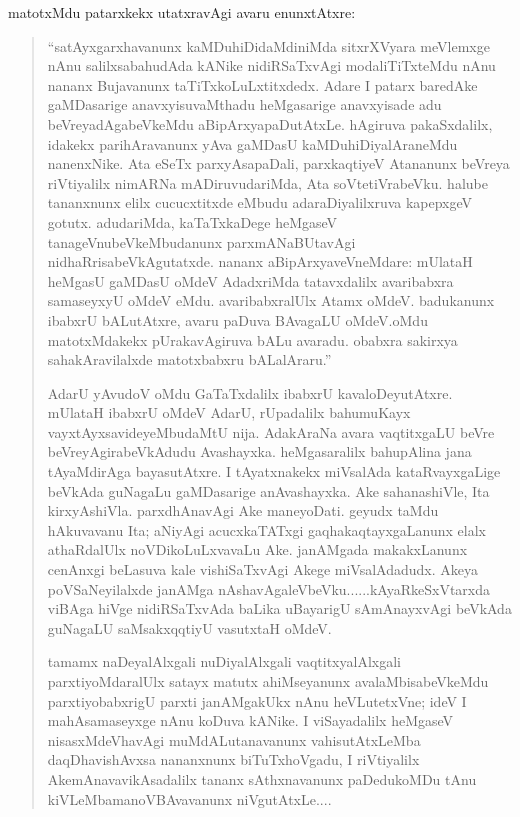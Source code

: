 matotxMdu patarxkekx utatxravAgi avaru enunxtAtxre:
\begin{quote}
``satAyxgarxhavanunx kaMDuhiDidaMdiniMda sitxrXVyara meVlemxge nAnu salilxsa\-bahudAda kANike nidiRSaTxvAgi modaliTiTxteMdu nAnu nananx Buja\-vanunx taTiTxkoLuLxtitxdedx. Adare I patarx baredAke gaMDasarige anavxyisuvaMthadu heMgasarige anavxyisade adu beVreyadAgabeVkeMdu aBipArxyapaDu\-tAtxLe. hAgiruva pakaSxdalilx, idakekx parihAravanunx yAva gaMDasU kaMDu\-hiDiyalAraneMdu nanenxNike. Ata eSeTx parxyAsapaDali, parxkaqtiyeV Ata\-nanunx beVreya riVtiyalilx nimARNa mADiruvudariMda, Ata soVte\-tiVrabeVku. halube tananxnunx elilx cucucxtitxde eMbudu adaraDiyalilxruva kapepxgeV gotutx. adudariMda, kaTaTxkaDege heMgaseV tanageVnubeVkeMbu\-danunx parxmANaBUtavAgi nidhaRrisabeVkAgutatxde. nananx aBipArxya\-veV\-neMdare: mUlataH heMgasU gaMDasU oMdeV AdadxriMda tatavxdalilx ava\-ribabxra samaseyxyU oMdeV eMdu. avaribabxralUlx Atamx oMdeV. badu\-kanunx ibabxrU bALutAtxre, avaru paDuva BAvagaLU oMdeV.\break \hbox{oMdu} matotxM\-dakekx pUrakavAgiruva bALu avaradu. obabxra sakirxya sahakAra\-vilalxde matotxbabxru bALalAraru.''

AdarU yAvudoV oMdu GaTaTxdalilx ibabxrU kavaloDeyutAtxre. mUlataH ibabxrU oMdeV AdarU, rUpadalilx bahumuKayx vayxtAyxsa\-videyeMbudaMtU nija. AdakAraNa avara vaqtitxgaLU beVre beVre\break\-yAgirabeVkAdudu Avashayxka. heMgasaralilx bahupAlina jana tAyaMdi\-rAga bayasutAtxre. I tAyatxnakekx miVsalAda kataRvayxgaLige beVkAda guNagaLu gaMDasarige anAvashayxka. Ake sahanashiVle, Ita kirxyAshiVla. parxdhAnavAgi Ake maneyoDati. geyudx taMdu hAkuvavanu Ita; aNiyAgi acucxkaTATxgi gaqhakaqtayxgaLanunx elalx athaRdalUlx noVDikoLuLxvavaLu Ake. janAMgada makakxLanunx cenAnxgi beLasuva kale vishiSaTxvAgi Akege miVsalAdadudx. Akeya poVSaNeyilalxde janAMga nAshavAgaleVbeVku......kAyaRkeSxVtarxda viBAga hiVge nidiRSaTxvAda baLika uBayarigU sAmAnayxvAgi beVkAda guNagaLU saMsakxqqtiyU vasutxtaH oMdeV.

tamamx naDeyalAlxgali nuDiyalAlxgali vaqtitxyalAlxgali parxtiyoMda\-ralUlx satayx matutx ahiMseyanunx avalaMbisabeVkeMdu parxtiyobabxrigU parxti janAMgakUkx nAnu heVLutetxVne; ideV I mahAsamaseyxge nAnu \hbox{koDuva} kANike. I viSayadalilx heMgaseV nisasxMdeVhavAgi muMdALutana\-vanunx vahisutAtxLeMba daqDhavishAvxsa nananxnunx biTuTxhoVgadu, I riVtiyalilx Ake\break mAnavavikAsadalilx tananx sAthxnavanunx paDedukoMDu tAnu kiVLeMba\break manoVBAvavanunx niVgutAtxLe....


\end{quote}
